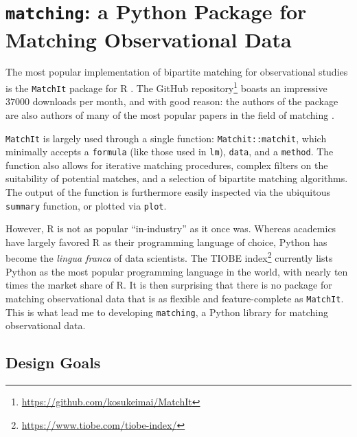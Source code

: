 \documentclass[11pt]{extarticle}
\begin{document}
\section{\texttt{matching}: a Python Package for Matching Observational Data}

The most popular implementation of bipartite matching for observational studies is the \texttt{MatchIt} package for R \parencite{ho_matchit_2011}.
The GitHub repository\footnote{\url{https://github.com/kosukeimai/MatchIt}} boasts an impressive $37000$ downloads per month, and with good reason: the authors of the package are also authors of many of the most popular papers in the field of matching \parencite{ho_matching_2007, imai_causal_2004, king_why_2019, stuart_matching_2010}.

\texttt{MatchIt} is largely used through a single function: \texttt{Matchit::matchit}, which minimally accepts a \texttt{formula} (like those used in \texttt{lm}), \texttt{data}, and a \texttt{method}. The function also allows for iterative matching procedures, complex filters on the suitability of potential matches, and a selection of bipartite matching algorithms. The output of the function is furthermore easily inspected via the ubiquitous \texttt{summary} function, or plotted via \texttt{plot}.

However, R is not as popular ``in-industry'' as it once was. Whereas academics have largely favored R as their programming language of choice, Python has become the \emph{lingua franca} of data scientists. The TIOBE index\footnote{\url{https://www.tiobe.com/tiobe-index/}} currently lists Python as the most popular programming language in the world, with nearly ten times the market share of R.
It is then surprising that there is no package for matching observational data that is as flexible and feature-complete as \texttt{MatchIt}. This is what lead me to developing \texttt{matching}, a Python library for matching observational data.

\subsection{Design Goals}
\end{document}

